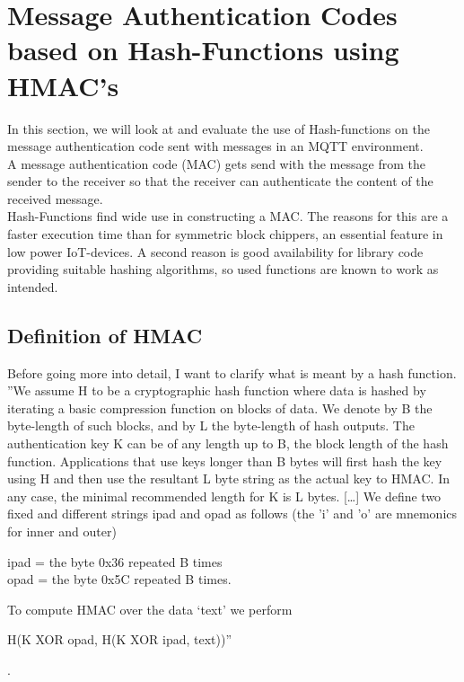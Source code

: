\section{Message Authentication Codes based on Hash-Functions using HMAC's}

In this section, we will look at and evaluate the use of Hash-functions on the message authentication code sent with messages in an MQTT environment. \\
A message authentication code (MAC) gets send with the message from the sender to the receiver so that the receiver can authenticate the content of the received message. \\
Hash-Functions find wide use in constructing a MAC. The reasons for this are a faster execution time than for symmetric block chippers, an essential feature in low power IoT-devices. A second reason is good availability for library code providing suitable hashing algorithms, so used functions are known to work as intended. 
\subsection{Definition of HMAC}
Before going more into detail, I want to clarify what is meant by a hash function. ''We assume H to be a cryptographic hash function where data is hashed by iterating a basic compression function on blocks of data. We denote by B the byte-length of such blocks, and by L the byte-length of hash outputs. The authentication key K can be of any length up to B, the block length of the hash function. Applications that use keys longer than B bytes will first hash the key using H and then use the resultant L byte string as the actual key to HMAC. In any case, the minimal recommended length for K is L bytes. [\dots] We define two fixed and different strings ipad and opad as follows (the ’i’ and ’o’ are mnemonics for inner and outer)
\begin{center}
ipad = the byte 0x36 repeated B times \\
opad = the byte 0x5C repeated B times.
\end{center}
To compute HMAC over the data ‘text’ we perform 
\begin{center}
H(K XOR opad, H(K XOR ipad, text))''
\end{center}
\cite{RFC}.  \\

